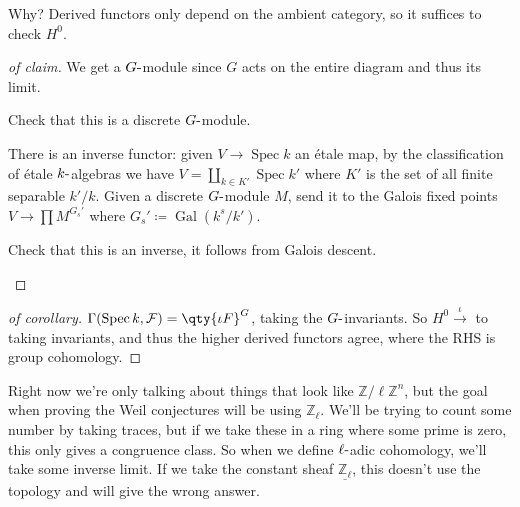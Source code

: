 Why? Derived functors only depend on the ambient category, so it
suffices to check \(H^0\).

\begin{proof}[of claim]

We get a \(G{\hbox{-}}\)module since \(G\) acts on the entire diagram
and thus its limit.

\begin{exercise}[?]

Check that this is a discrete \(G{\hbox{-}}\)module.

\end{exercise}

There is an inverse functor: given \(V\to \operatorname{Spec}k\) an
étale map, by the classification of étale \(k{\hbox{-}}\)algebras we
have \(V = {\coprod}_{k \in K'} \operatorname{Spec}k'\) where \(K'\) is
the set of all finite separable \(k'/k\). Given a discrete
\(G{\hbox{-}}\)module \(M\), send it to the Galois fixed points
\(V \to \prod M^{G_s'}\) where
\(G_s' \coloneqq\operatorname{Gal}(k^s/k')\).

\begin{exercise}[Check]

Check that this is an inverse, it follows from Galois descent.

\end{exercise}

\end{proof}

\begin{proof}[of corollary]

\(\Gamma(\operatorname{Spec}k, \mathcal{F}) = \qty{\iota F}^G\), taking
the \(G{\hbox{-}}\)invariants. So \(H^0 \xrightarrow{\iota}\) to taking
invariants, and thus the higher derived functors agree, where the RHS is
group cohomology.

\end{proof}

\begin{remark}

Right now we're only talking about things that look like
\(\mathbb{Z}/\ell\mathbb{Z}^n\), but the goal when proving the Weil
conjectures will be using \({\mathbb{Z}}_\ell\). We'll be trying to
count some number by taking traces, but if we take these in a ring where
some prime is zero, this only gives a congruence class. So when we
define \(\ell{\hbox{-}}\)adic cohomology, we'll take some inverse limit.
If we take the constant sheaf \(\underline{{\mathbb{Z}}_\ell}\), this
doesn't use the topology and will give the wrong answer.

\end{remark}

